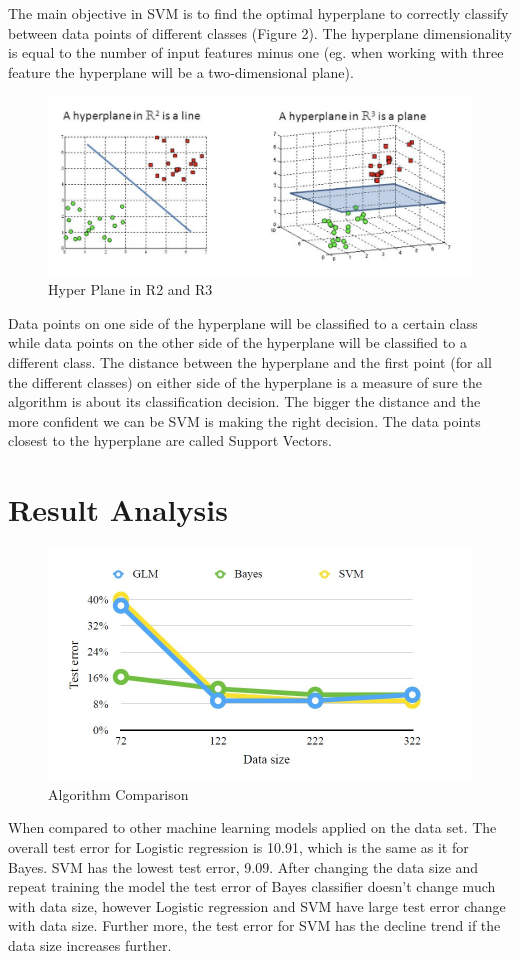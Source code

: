 The main objective in SVM is to find the optimal hyperplane to correctly classify between data points of different classes (Figure 2). The hyperplane dimensionality is equal to the number of input features minus one (eg. when working with three feature the hyperplane will be a two-dimensional plane).

\begin{figure}[h]
	\label{ss}    %
	\centering
	\includegraphics[width= 11 cm]{svm2.png}
	\caption{Hyper Plane in R2 and R3 }
\end{figure}	
 Data points on one side of the hyperplane will be classified to a certain class while data points on the other side of the hyperplane will be classified to a different class. The distance between the hyperplane and the first point (for all the different classes) on either side of the hyperplane is a measure of sure the algorithm is about its classification decision. The bigger the distance and the more confident we can be SVM is making the right decision. The data points closest to the hyperplane are called Support Vectors. 
 

\section{Result Analysis}

\begin{figure}[h]
	\label{ss}    %
	\centering
	\includegraphics[width= 09 cm]{erroranaly.jpg}
	\caption{Algorithm Comparison }
\end{figure}	
When compared to other machine learning models applied on the data set. The overall test error for Logistic regression is 10.91, which is the same as it for
Bayes. SVM has the lowest test error, 9.09. After changing the data size and repeat training the model the test error of Bayes classifier doesn’t change much
with data size, however Logistic regression and SVM have large test error change with data size. Further more, the test error for SVM has the decline trend if the data size increases further.



